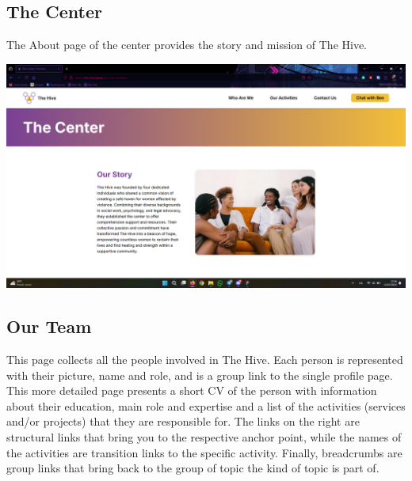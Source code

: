 \subsection{The Center}
The About page of the center provides the story and mission of The Hive.
\vspace{1em}
\begin{center}
    \includegraphics[width=0.5\linewidth]{img/design-document/website-screenshots/centerpage.png}
\end{center}

\subsection{Our Team}
This page collects all the people involved in The Hive. Each person is represented with their picture, name and role,
and is a group link to the single profile page. This more detailed page presents a short CV of the person with information about their education, main role and expertise and a list of the activities (services and/or projects) that they are responsible for.
The links on the right are structural links that bring you to the respective anchor point, while the names of the activities
are transition links to the specific activity. Finally, breadcrumbs are group links that bring back to the group of topic the kind of topic is part of.

